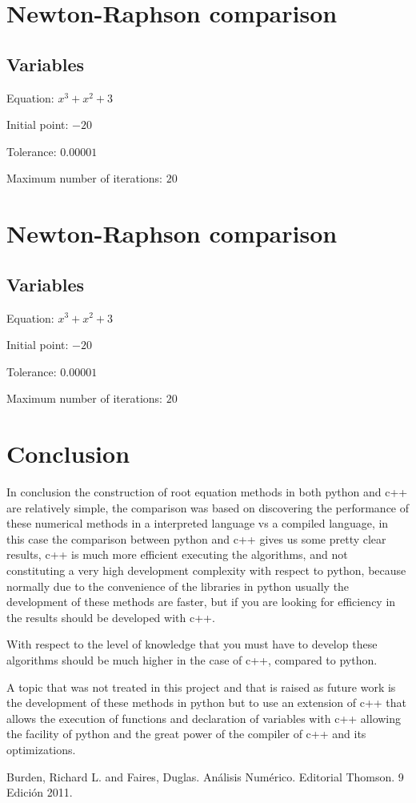 \documentclass[conference]{IEEEtran}
\begin{document}
\section{Newton-Raphson comparison}
\subsection{Variables}

Equation: \(x^3 + x^2 + 3\) 

Initial point: \(-20\)

Tolerance: \(0.00001\) 

Maximum number of iterations: \(20\)

\section{Newton-Raphson comparison}
\subsection{Variables}

Equation: \(x^3 + x^2 + 3\) 

Initial point: \(-20\)

Tolerance: \(0.00001\) 

Maximum number of iterations: \(20\)


\section{Conclusion}
In conclusion the construction of root equation methods in both python and c++ are relatively simple, the comparison was based on discovering the performance of these numerical methods in a interpreted language vs a compiled language, in this case the comparison between python and c++ gives us some pretty clear results, c++ is much more efficient executing the algorithms, and not constituting a very high development complexity with respect to python, because normally due to the convenience of the libraries in python usually the development of these methods are faster, but if you are looking for efficiency in the results should be developed with c++. 

With respect to the level of knowledge that you must have to develop these algorithms should be much higher in the case of c++, compared to python. 

A topic that was not treated in this project and that is raised as future work is the development of these methods in python but to use an extension of c++ that allows the execution of functions and declaration of variables with c++ allowing the facility of python and the great power of the compiler of c++ and its optimizations. 

\begin{thebibliography}{00}
 Burden, Richard L. and Faires, Duglas. Análisis Numérico. Editorial Thomson. 9 Edición 2011.
\end{thebibliography}
\end{document}

